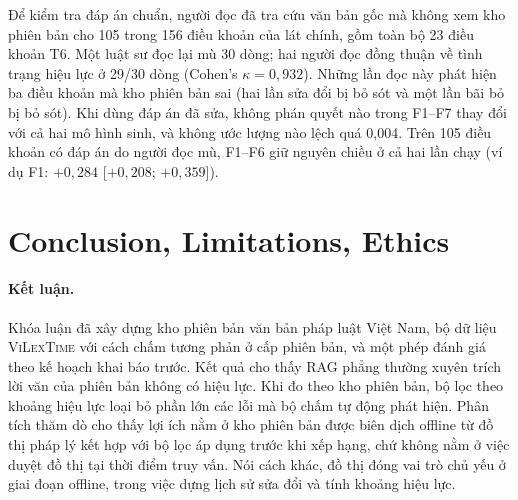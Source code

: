 \documentclass[11pt,a4paper]{article}
\newcommand{\sv}{\textsc{ViLexTime}}
\begin{document}
Để kiểm tra đáp án chuẩn, người đọc đã tra cứu văn bản gốc mà không xem kho phiên bản cho 105 trong 156 điều khoản của lát chính, gồm toàn bộ 23 điều khoản T6. Một luật sư đọc lại mù 30 dòng; hai người đọc đồng thuận về tình trạng hiệu lực ở 29/30 dòng (Cohen's $\kappa=0{,}932$). Những lần đọc này phát hiện ba điều khoản mà kho phiên bản sai (hai lần sửa đổi bị bỏ sót và một lần bãi bỏ bị bỏ sót). Khi dùng đáp án đã sửa, không phán quyết nào trong F1--F7 thay đổi với cả hai mô hình sinh, và không ước lượng nào lệch quá 0,004. Trên 105 điều khoản có đáp án do người đọc mù, F1--F6 giữ nguyên chiều ở cả hai lần chạy (ví dụ F1: $+0{,}284$ [$+0{,}208$; $+0{,}359$]).

\section{Conclusion, Limitations, Ethics}

\paragraph{Kết luận.} Khóa luận đã xây dựng kho phiên bản văn bản pháp luật Việt Nam, bộ dữ liệu \sv{} với cách chấm tương phản ở cấp phiên bản, và một phép đánh giá theo kế hoạch khai báo trước. Kết quả cho thấy RAG phẳng thường xuyên trích lời văn của phiên bản không có hiệu lực. Khi đo theo kho phiên bản, bộ lọc theo khoảng hiệu lực loại bỏ phần lớn các lỗi mà bộ chấm tự động phát hiện. Phân tích thăm dò cho thấy lợi ích nằm ở kho phiên bản được biên dịch offline từ đồ thị pháp lý kết hợp với bộ lọc áp dụng trước khi xếp hạng, chứ không nằm ở việc duyệt đồ thị tại thời điểm truy vấn. Nói cách khác, đồ thị đóng vai trò chủ yếu ở giai đoạn offline, trong việc dựng lịch sử sửa đổi và tính khoảng hiệu lực.
\end{document}
